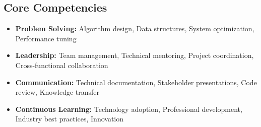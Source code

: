 \documentclass[10pt, letterpaper]{article}
\newenvironment{highlights}{
\begin{itemize}[
topsep=0.10 cm,
parsep=0.10 cm,
partopsep=0pt,
itemsep=0pt,
leftmargin=0 cm + 10pt
]
}{
\end{itemize}
} %
\begin{document}
\begin{samepage}
\section{Core Competencies}
\vspace{0.1cm}

\begin{highlights}
\item \textbf{Problem Solving:} Algorithm design, Data structures, System optimization, Performance tuning
\item \textbf{Leadership:} Team management, Technical mentoring, Project coordination, Cross-functional collaboration
\item \textbf{Communication:} Technical documentation, Stakeholder presentations, Code review, Knowledge transfer
\item \textbf{Continuous Learning:} Technology adoption, Professional development, Industry best practices, Innovation
\end{highlights}
\end{samepage}
\end{document}
